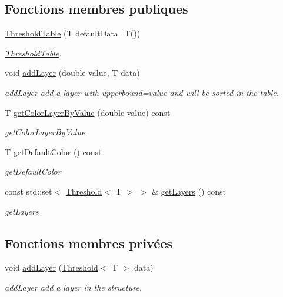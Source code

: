 \subsection*{Fonctions membres publiques}
\begin{DoxyCompactItemize}
\item 
\hyperlink{class_threshold_table_aed8c318959eca9a7f33944a8300b3e6a}{Threshold\+Table} (T default\+Data=T())
\begin{DoxyCompactList}\small\item\em \hyperlink{class_threshold_table}{Threshold\+Table}. \end{DoxyCompactList}\item 
void \hyperlink{class_threshold_table_a8724b07d34b3b1c84d4e6e6f2afdad37}{add\+Layer} (double value, T data)
\begin{DoxyCompactList}\small\item\em add\+Layer add a layer with upperbound=value and will be sorted in the table. \end{DoxyCompactList}\item 
T \hyperlink{class_threshold_table_a35e7219d9476c3a5c0362e80ab7f5596}{get\+Color\+Layer\+By\+Value} (double value) const
\begin{DoxyCompactList}\small\item\em get\+Color\+Layer\+By\+Value \end{DoxyCompactList}\item 
T \hyperlink{class_threshold_table_ac20ccb2dd4cd20e96036818ca0106f93}{get\+Default\+Color} () const
\begin{DoxyCompactList}\small\item\em get\+Default\+Color \end{DoxyCompactList}\item 
const std\+::set$<$ \hyperlink{struct_threshold}{Threshold}$<$ T $>$ $>$ \& \hyperlink{class_threshold_table_a6cb1745a571a4e071e9b74ad34372405}{get\+Layers} () const
\begin{DoxyCompactList}\small\item\em get\+Layers \end{DoxyCompactList}\end{DoxyCompactItemize}
\subsection*{Fonctions membres privées}
\begin{DoxyCompactItemize}
\item 
void \hyperlink{class_threshold_table_a0323e0da4f0a97b1b3f84c1d2ae7a5b2}{add\+Layer} (\hyperlink{struct_threshold}{Threshold}$<$ T $>$ data)
\begin{DoxyCompactList}\small\item\em add\+Layer add a layer in the structure. \end{DoxyCompactList}\end{DoxyCompactItemize}
